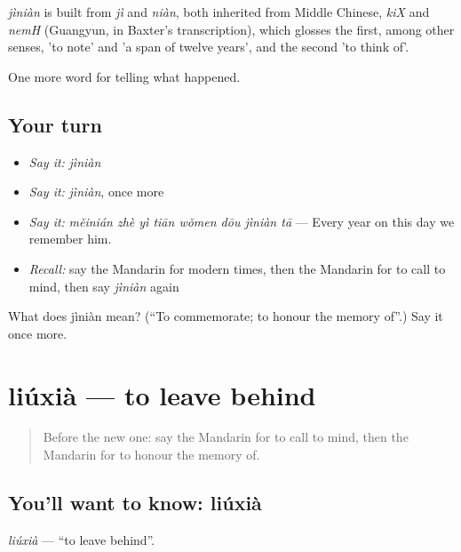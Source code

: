 \begin{cousinweb}
\emph{jìniàn} is built from \emph{jì} and \emph{niàn}, both inherited from Middle Chinese, \emph{kiX} and \emph{nemH} (Guangyun, in Baxter's transcription), which glosses the first, among other senses, 'to note' and 'a span of twelve years', and the second 'to think of'.
\end{cousinweb}

\begin{grammarlens}[title={What you've built}]
One more word for telling what happened.
\end{grammarlens}

\subsection*{Your turn}
\begin{itemize}
\raggedright
  \item \emph{Say it:} \emph{jìniàn}
  \item \emph{Say it:} \emph{jìniàn}, once more
  \item \emph{Say it:} \emph{měinián zhè yì tiān wǒmen dōu jìniàn tā} — Every year on this day we remember him.
  \item \emph{Recall:} say the Mandarin for modern times, then the Mandarin for to call to mind, then say \emph{jìniàn} again
\end{itemize}

\begin{tcolorbox}[breakable,colback=teal!4,colframe=teal!35!black,title={Before you move on}]
What does jìniàn mean? (\textquotedblleft{}To commemorate; to honour the memory of\textquotedblright{}.) Say it once more.
\end{tcolorbox}
\section[liúxià]{liúxià — to leave behind}

\label{lesson:ZH-C324-liuxia}



\begin{quote}
Before the new one: say the Mandarin for to call to mind, then the Mandarin for to honour the memory of.
\end{quote}

\subsection*{You'll want to know: liúxià}
\emph{liúxià} — \textquotedblleft{}to leave behind\textquotedblright{}.

